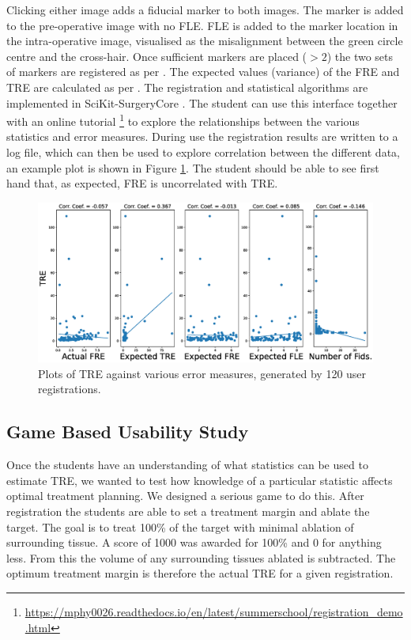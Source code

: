 Clicking either image adds a fiducial marker to both images. The marker is added to the pre-operative image with no \gls{FLE}. \gls{FLE} is added to the marker location in the intra-operative image, visualised as the misalignment between the green circle centre and the cross-hair. Once sufficient markers are placed ($>2$) the two sets of markers are registered as per \cite{Arun1987}. The expected values (variance) of the \gls{FRE} and \gls{TRE} are calculated 
as per \cite{Fitzpatrick1998}. The registration and statistical algorithms are implemented in SciKit-SurgeryCore \cite{matt_clarkson_2020_3965731}. The student can use this interface together with an 
online tutorial \footnote{\url{https://mphy0026.readthedocs.io/en/latest/summerschool/registration_demo.html}}
to explore the relationships between the various statistics and error measures. During use the registration results are 
written to a log file, which can then be used to explore correlation between the different data, an example plot is shown in Figure \ref{fig:correlation}. 
The student should be able to see first hand that, as expected, \gls{FRE} is uncorrelated with \gls{TRE}.

\begin{figure}
	\begin{center}
	\includegraphics[width=0.9\linewidth]{SciKit-SurgeryF.R.E.D._Correlation_Plots.eps}
		\caption{\label{fig:correlation}Plots of TRE against various error measures, generated by 
		120 user registrations.}
	\end{center}
\end{figure}

\subsection{Game Based Usability Study}
Once the students have an understanding of what statistics can be used to estimate \gls{TRE}, we wanted to test 
how knowledge of a particular statistic affects optimal treatment planning. We designed a serious game to 
do this. After registration the students are able to set a treatment margin and ablate the target. The goal is 
to treat 100\% of the target with minimal ablation of surrounding tissue. A score of 1000 was awarded for 100\% and 0 
for anything less. From this the volume of any surrounding tissues ablated is subtracted. The optimum treatment 
margin is therefore the actual \gls{TRE} for a given registration. 

